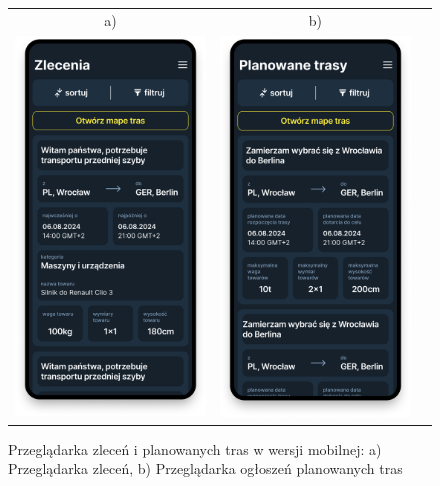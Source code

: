 \begin{figure}[H]
	\centering
	\begin{tabular}{@{}ccc@{}}
            a) & b)\\
    \includegraphics[width=0.3\linewidth]{rozdzial1/zlecenia_m.png} &
    \includegraphics[width=0.3\linewidth]{rozdzial1/planowane_trasy_m.png}
    \end{tabular}
    \caption{Przeglądarka zleceń i planowanych tras w wersji mobilnej: a) Przeglądarka zleceń, b) Przeglądarka ogłoszeń planowanych tras}
	\label{Rys. fig:Przeglądarka zleceń i planowanych tras - ab - mobile}
\end{figure}

